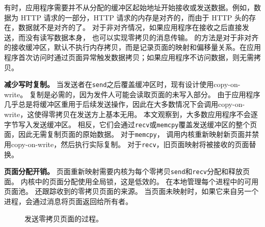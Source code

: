 有时，应用程序需要并不从分配的缓冲区起始地址开始接收或发送数据。例如，数据为 HTTP 请求的一部分，HTTP 请求的内存是对齐的，而由于 HTTP 头的存在，数据就不是对齐的了。
对于非对齐情况，如果应用程序在接收之后直接发送，而没有读写数据本身，\sys{} 也可以实现零拷贝的消息传输。\sys{} 的方法是对于非对齐的接收缓冲区，默认不执行内存拷贝，而是记录页面的映射和偏移量关系。在应用程序首次访问时通过页面异常触发数据拷贝；如果应用程序不访问数据，则无需拷贝。



\textbf{减少写时复制。}
当发送者在\texttt {send}之后覆盖缓冲区时，现有设计使用copy-on-write。
复制是必需的，因为发件人可能会读取页面的未写入部分。
由于应用程序几乎总是将缓冲区重用于后续发送操作，因此在大多数情况下会调用copy-on-write，这使得零拷贝在发送方上基本无用。
本文观察到，大多数应用程序不会逐字节写入发送缓冲区。 相反，它们会通过\texttt {recv}或\texttt {memcpy}覆盖发送缓冲区的整个页面，因此无需复制页面的原始数据。
对于\texttt {memcpy}，\libipc{} 调用内核重新映射新页面并禁用copy-on-write，然后执行实际复制。
对于\texttt {recv}，旧页面映射将被接收的页面替换。


\textbf {页面分配开销。}
页面重新映射需要内核为每个零拷贝\texttt {send}和\texttt {recv}分配和释放页面。
内核中的页面分配使用全局锁，这是低效的。 \libipc {}在本地管理每个进程中的可用页面池。
\libipc {}还跟踪收到的零拷贝页面的来源。
当页面未映射时，如果它来自另一个进程，\libipc {}会通过消息将页面返回给所有者。


\begin{figure}[htbp]
	\centering
	\hspace{0.02\textwidth}
	\caption{发送零拷贝页面的过程。}
\end{figure}


